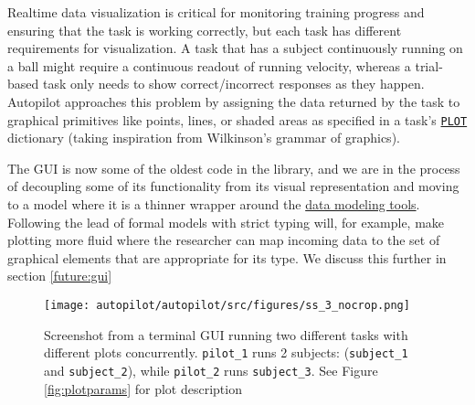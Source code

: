 Realtime data visualization is critical for monitoring training progress and ensuring that the task is working correctly, but each task has different requirements for visualization. A task that has a subject continuously running on a ball might require a continuous readout of running velocity, whereas a trial-based task only needs to show correct/incorrect responses as they happen. Autopilot approaches this problem by assigning the data returned by the task to graphical primitives like points, lines, or shaded areas as specified in a task's \hyperref[sec:taskcomponents]{\texttt{PLOT}} dictionary (taking inspiration from Wilkinson's grammar of graphics\citep{wilkinsonGrammarGraphics2012}).

The GUI is now some of the oldest code in the library, and we are in the process of decoupling some of its functionality from its visual representation and moving to a model where it is a thinner wrapper around the \hyperref[sec:data]{data modeling tools}. Following the lead of formal models with strict typing will, for example, make plotting more fluid where the researcher can map incoming data to the set of graphical elements that are appropriate for its type. We discuss this further in section \ref{future:gui}

\begin{figure*}[hb!]
\caption{Screenshot from a terminal GUI running two different tasks with different plots concurrently. \texttt{pilot\_1} runs 2 subjects: (\texttt{subject\_1} and \texttt{subject\_2}), while \texttt{pilot\_2} runs \texttt{subject\_3}. See Figure \ref{fig:plotparams} for plot description}
\label{fig:gui}
\texttt{[image: autopilot/autopilot/src/figures/ss\_3\_nocrop.png]}
\end{figure*}%
